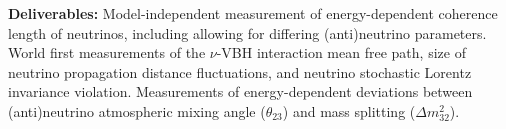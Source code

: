 \documentclass[a4paper,11pt]{article}
\begin{document}


\textbf{Deliverables:} Model-independent measurement of energy-dependent coherence length of neutrinos, including allowing for differing (anti)neutrino parameters. World first measurements of the $\nu$-VBH interaction mean free path, size of neutrino propagation distance fluctuations, and neutrino stochastic Lorentz invariance violation. Measurements of energy-dependent deviations between (anti)neutrino atmospheric mixing angle ($\theta_{23}$) and mass splitting ($\Delta m^2_{32}$).







\end{document}
